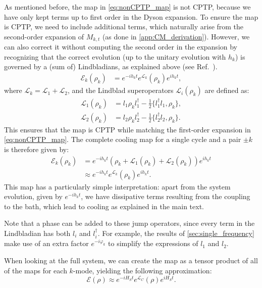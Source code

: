 As mentioned before, the map in \cref{eq:nonCPTP_map} is not CPTP, because we have only kept terms up to first order in the Dyson expansion.
To ensure the map is CPTP, we need to include additional terms, which naturally arise from the second-order expansion of $M_{k,t}$ (as done in \cref{app:CM_derivation}). However, we can also correct it without computing the second order in the expansion by recognizing that the correct evolution (up to the unitary evolution with $h_k$) is governed by a (sum of) Lindbladians, as explained above (see Ref.~\cite{Wolf2008Dividing}).
\begin{align}
    \mathcal{E}_k(\rho_k) &= e^{-i h_k t} e^{\mathcal{L}_k}(\rho_k) e^{i h_k t},
\end{align}
where $\mathcal{L}_k = \mathcal{L}_1 + \mathcal{L}_2$, and the Lindblad superoperators $\mathcal{L}_i(\rho_k)$ are defined as:
\begin{align}
    \mathcal{L}_1(\rho_k) &= l_1 \rho_k l_1^\dag - \frac{1}{2} \{ l_1^\dag l_1, \rho_k \},\\
    \mathcal{L}_2(\rho_k) &= l_2 \rho_k l_2^\dag - \frac{1}{2} \{ l_2^\dag l_2, \rho_k \}.
\end{align}
This ensures that the map is CPTP while matching the first-order expansion in \cref{eq:nonCPTP_map}. The complete cooling map for a single cycle and a pair $\pm k$ is therefore given by:
\begin{align}
    \label{eq:approxiMap}
    \mathcal{E}_k(\rho_k) &= e^{-i h_k t} \left( \rho_k + \mathcal{L}_1(\rho_k) + \mathcal{L}_2(\rho_k) \right) e^{i h_k t} \nonumber\\
                          &\approx e^{-i h_k t} e^{\mathcal{L}_k}(\rho_k) e^{i h_k t}.
\end{align}
This map has a particularly simple interpretation: apart from the system evolution, given by $e^{-i h_k t}$, we have dissipative terms resulting from the coupling to the bath, which lead to cooling as explained in the main text.

Note that a phase can be added to these jump operators, since every term in the Lindbladian has both $l_i$ and $l_i^\dag$. For example, the results of \cref{sec:single_frequency} make use of an extra factor $e^{-i\varphi_k}$ to simplify the expressions of $l_1$ and $l_2$.

When looking at the full system, we can create the map as a tensor product of all of the maps for each $k$-mode, yielding the following approximation:
\begin{equation}
    \mathcal{E}(\rho)\approx e^{-i H_S t} e^{\mathcal{L}_C}(\rho) e^{i H_S t}.
    \label{eq:full_cooling_map_approx}
\end{equation}

